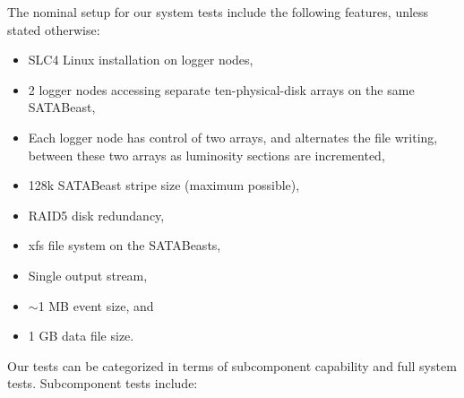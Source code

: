 The nominal setup for our system tests include the following features, unless stated
otherwise:
\begin{itemize}
  \item SLC4 Linux installation on logger nodes,
  \item 2 logger nodes accessing separate ten-physical-disk arrays on the same SATABeast,
  \item Each logger node has control of two arrays, and alternates the file writing,
between these two arrays as luminosity sections are incremented,
  \item 128k SATABeast stripe size (maximum possible),
  \item RAID5 disk redundancy,
  \item xfs file system on the SATABeasts,
  \item Single output stream,
  \item $\sim$1 MB event size, and
  \item 1 GB data file size. 
\end{itemize}
Our tests can be categorized in terms of subcomponent capability and full system tests.
Subcomponent tests include:
